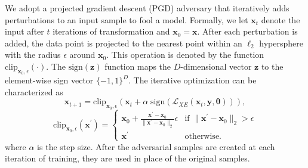 We adopt a projected gradient descent (PGD) adversary that iteratively adds perturbations to an input sample to fool a model.
%
Formally, we let $\bm x_t$ denote the input after $t$ iterations of transformation and $\bm x_0 = \bm x$. After each perturbation is added, the data point is projected to the nearest point within an $\ell_2$ hypersphere with the radius $\epsilon$ around $\bm x_0$. This operation is denoted by the function $\text{clip}_{\bm x_0, \epsilon}(\cdot)$. The $\text{sign}(\bm z)$ function maps the $D$-dimensional vector $\bm z$ to the element-wise sign vector $\{-1, 1\}^D$. The iterative optimization can be characterized as 
\begin{equation}
    \bm x_{t+1} = \text{clip}_{\bm x_0, \epsilon}(\bm x_ {t} + \alpha \;  \text{sign}(\mathcal{L}_{XE}(\bm x_t, \bm y, \bm \theta))),
\end{equation}
\begin{equation}
\text{clip}_{\bm x_0, \epsilon}(\bm x^\prime) = 
\begin{cases} 
\bm x_0 + \frac{\bm x^\prime - \bm x_0}{\| \bm x^\prime - \bm x_0 \|_2} \epsilon & \text{if } \| \bm x^\prime - \bm x_0 \|_2 > \epsilon\\
\bm x^\prime & \text{otherwise.}
\end{cases}
\end{equation}
where $\alpha$ is the step size. After the adversarial samples are created at each iteration of training, they are used in place of the original samples.





